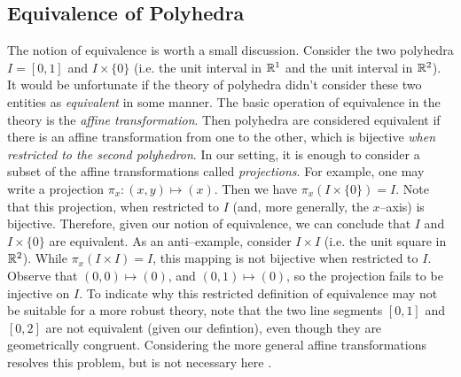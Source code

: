 \subsection{Equivalence of Polyhedra}  The notion of equivalence is worth a small discussion.  Consider the two polyhedra $I = [0,1]$ and $I\times\{0\}$ (i.e. the unit interval in $\mathbb{R}^1$ and the unit interval in $\mathbb{R}^2$).  It would be unfortunate if the theory of polyhedra didn't consider these two entities as \textit{equivalent} in some manner.  The basic operation of equivalence in the theory is the \textit{affine transformation}.  Then polyhedra are considered equivalent if there is an affine transformation from one to the other, which is bijective \textit{when restricted to the second polyhedron}.  In our setting, it is enough to consider a subset of the affine transformations called \textit{projections}.  For example, one may write a projection $\pi_x: (x,y) \mapsto (x)$.  Then we have $\pi_x (I \times \{0\}) = I$.  Note that this projection, when restricted to $I$ (and, more generally, the $x$--axis) is bijective.  Therefore, given our notion of equivalence, we can conclude that $I$ and $I\times \{0\}$ are equivalent.  As an anti--example, consider $I\times I$ (i.e. the unit square in $\mathbb{R}^2$).  While $\pi_x(I\times I) = I$, this mapping is not bijective when restricted to $I$.  Observe that $(0,0) \mapsto (0)$, and $(0,1) \mapsto (0)$, so the projection fails to be injective on $I$.  To indicate why this restricted definition of equivalence may not be suitable for a more robust theory, note that the two line segments $[0,1]$ and $[0,2]$ are not equivalent (given our defintion), even though they are geometrically congruent.  Considering the more general affine transformations resolves this problem, but is not necessary here .

